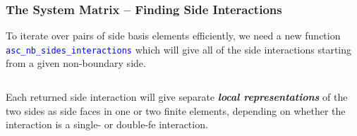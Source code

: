 \documentclass[compress]{beamer}
\begin{document}
\begin{frame}
  \frametitle{The System Matrix -- Finding Side Interactions}
  To iterate over pairs of side basis elements efficiently, we need a new function \texttt{\small \textcolor{blue}{asc\_nb\_sides\_interactions}}
  which will give all of the side interactions starting from a given non-boundary side. 
  \pause
  \begin{columns}
  \end{columns}
  
  \pause
  \vspace{0.15cm}
  Each returned side interaction will give separate \emph{\textbf{local representations}} of the two sides as side faces in one or two
  finite elements, depending on whether the interaction is a single- or double-fe interaction.
\end{frame}
\end{document}
